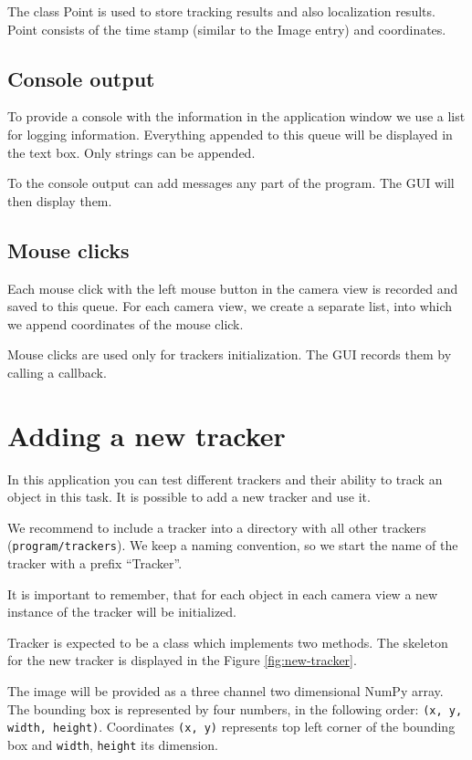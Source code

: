 The class Point is used to store tracking results and also localization
results. Point consists of the time stamp (similar to the Image entry) and
coordinates.

\subsection*{Console output}

To provide a console with the information in the application window we use a
list for logging information. Everything appended to this queue will be
displayed in the text box. Only strings can be appended.

To the console output can add messages any part of the program. The GUI will
then display them.

\subsection*{Mouse clicks}

Each mouse click with the left mouse button in the camera view is recorded and
saved to this queue. For each camera view, we create a separate list, into
which we append coordinates of the mouse click.

Mouse clicks are used only for trackers initialization. The GUI records them by
calling a callback.

\section{Adding a new tracker} 

In this application you can test different
trackers and their ability to track an object in this task. It is possible to
add a new tracker and use it.

We recommend to include a tracker into a directory with all other trackers
(\verb+program/trackers+). We keep a naming convention, so we start the name of
the tracker with a prefix ``Tracker''.

It is important to remember, that for each object in each camera view a new
instance of the tracker will be initialized.

Tracker is expected to be a class which implements two methods. The skeleton
for the new tracker is displayed in the Figure \ref{fig:new-tracker}.

The image will be provided as a three channel two dimensional NumPy array. The
bounding box is represented by four numbers, in the following order: \verb+(x, y, width, height)+.
Coordinates \verb+(x, y)+ represents top left corner of
the bounding box and \verb+width+, \verb+height+ its dimension.

